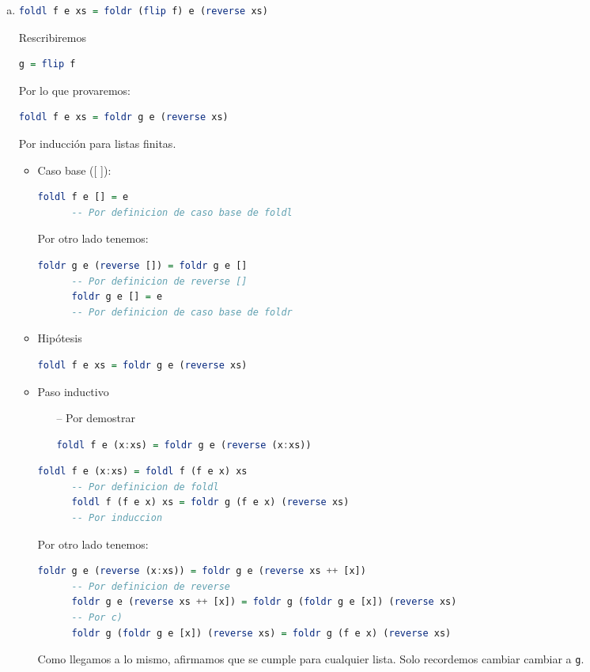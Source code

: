 \documentclass[spanish,12pt,letterpaper]{article}
\begin{document}
\begin{enumerate}[(a)]
\item
  \begin{lstlisting}[language=Haskell]
    foldl f e xs = foldr (flip f) e (reverse xs)
  \end{lstlisting}
  Rescribiremos
  \begin{lstlisting}[language=Haskell]
    g = flip f
  \end{lstlisting}
  Por lo que provaremos:
  \begin{lstlisting}[language=Haskell]
    foldl f e xs = foldr g e (reverse xs)
  \end{lstlisting}
  Por inducción para listas finitas.
  \begin{itemize}
  \item Caso base ([ ]):
    \begin{lstlisting}[language=Haskell]
      foldl f e [] = e
      -- Por definicion de caso base de foldl
    \end{lstlisting}
    Por otro lado tenemos:
    \begin{lstlisting}[language=Haskell]
      foldr g e (reverse []) = foldr g e []
      -- Por definicion de reverse []
      foldr g e [] = e
      -- Por definicion de caso base de foldr
    \end{lstlisting}      
  \item Hipótesis
    \begin{lstlisting}[language=Haskell]
      foldl f e xs = foldr g e (reverse xs)
    \end{lstlisting}
  \item Paso inductivo
    \begin{itemize}
    \item [--] Por demostrar
      \begin{lstlisting}[language=Haskell]
        foldl f e (x:xs) = foldr g e (reverse (x:xs))
      \end{lstlisting}
    \end{itemize}
    \begin{lstlisting}[language=Haskell]
      foldl f e (x:xs) = foldl f (f e x) xs
      -- Por definicion de foldl
      foldl f (f e x) xs = foldr g (f e x) (reverse xs)
      -- Por induccion
    \end{lstlisting}
    Por otro lado tenemos:
    \begin{lstlisting}[language=Haskell]
      foldr g e (reverse (x:xs)) = foldr g e (reverse xs ++ [x])
      -- Por definicion de reverse
      foldr g e (reverse xs ++ [x]) = foldr g (foldr g e [x]) (reverse xs)
      -- Por c)
      foldr g (foldr g e [x]) (reverse xs) = foldr g (f e x) (reverse xs)
    \end{lstlisting}
    Como llegamos a lo mismo, afirmamos que se cumple para cualquier lista. Solo
    recordemos cambiar cambiar a \texttt{g}.
  \end{itemize}
  

\end{enumerate}
\end{document}

